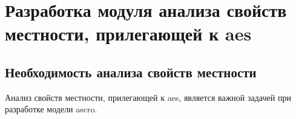 \chapter{Разработка модуля анализа свойств местности, прилегающей к \ac{aes}}


\section{Необходимость анализа свойств местности}

Анализ свойств местности, прилегающей к \ac{aes}, является важной задачей при разработке модели \ac{ascro}.